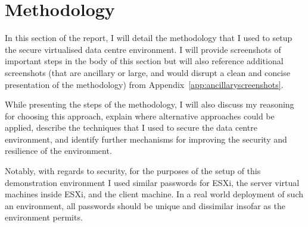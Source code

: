 \pagebreak
\section{Methodology}
In this section of the report, I will detail the methodology that I used to setup the secure virtualised data centre environment. I will provide screenshots of important steps in the body of this section but will also reference additional screenshots (that are ancillary or large, and would disrupt a clean and concise presentation of the methodology) from Appendix~\ref{app:ancillaryscreenshots}.

While presenting the steps of the methodology, I will also discuss my reasoning for choosing this approach, explain where alternative approaches could be applied, describe the techniques that I used to secure the data centre environment, and identify further mechanisms for improving the security and resilience of the environment.

Notably, with regards to security, for the purposes of the setup of this demonstration environment I used similar passwords for ESXi, the server virtual machines inside ESXi, and the client machine. In a real world deployment of such an environment, all passwords should be unique and dissimilar insofar as the environment permits.






